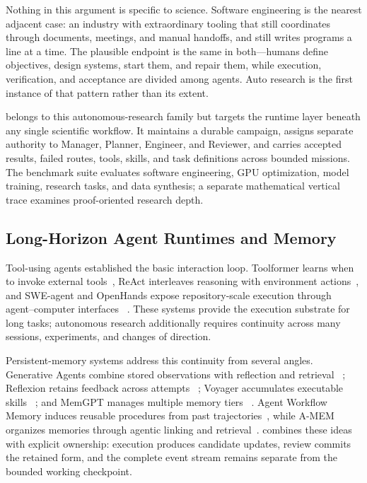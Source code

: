 Nothing in this argument is specific to science. Software engineering is the nearest
adjacent case: an industry with extraordinary tooling that still coordinates through
documents, meetings, and manual handoffs, and still writes programs a line at a time.
The plausible endpoint is the same in both---humans define objectives, design
systems, start them, and repair them, while execution, verification, and acceptance
are divided among agents. Auto research is the first instance of that pattern rather
than its extent.

\systemname belongs to this autonomous-research family but targets the runtime
layer beneath any single scientific workflow. It maintains a durable campaign,
assigns separate authority to Manager, Planner, Engineer, and Reviewer, and carries
accepted results, failed routes, tools, skills, and task definitions across bounded
missions. The benchmark suite evaluates software engineering, GPU optimization,
model training, research tasks, and data synthesis; a separate mathematical vertical
trace examines proof-oriented research depth.

\subsection{Long-Horizon Agent Runtimes and Memory}

Tool-using agents established the basic interaction loop. Toolformer learns when to
invoke external tools~\citep{schick2023toolformer}, ReAct interleaves reasoning with
environment actions~\citep{yao2023react}, and SWE-agent and OpenHands expose
repository-scale execution through agent--computer interfaces
~\citep{yang2024sweagent,wang2024openhands}. These systems provide the execution
substrate for long tasks; autonomous research additionally requires continuity
across many sessions, experiments, and changes of direction.

Persistent-memory systems address this continuity from several angles. Generative
Agents combine stored observations with reflection and retrieval
~\citep{park2023generative}; Reflexion retains feedback across attempts
~\citep{shinn2023reflexion}; Voyager accumulates executable skills
~\citep{wang2023voyager}; and MemGPT manages multiple memory tiers
~\citep{packer2023memgpt}. Agent Workflow Memory induces reusable procedures from
past trajectories~\citep{wang2024workflowmemory}, while A-MEM organizes memories
through agentic linking and retrieval~\citep{xu2025amem}. \systemname combines
these ideas with explicit ownership: execution produces candidate updates, review
commits the retained form, and the complete event stream remains separate from the
bounded working checkpoint.

